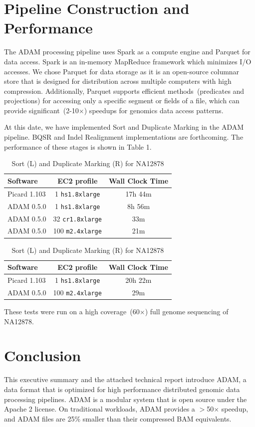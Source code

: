 \documentclass[10pt]{article}
\begin{document}
\section{Pipeline Construction and Performance}

The ADAM processing pipeline uses Spark as a compute engine and Parquet for data access. Spark is an in-memory MapReduce framework
which minimizes I/O accesses. We chose Parquet for data storage as it is an open-source columnar store that is designed for distribution across
multiple computers with high compression. Additionally, Parquet supports efficient methods~(predicates and projections) for accessing only a
specific segment or fields of a file, which can provide significant~(2-10$\times$) speedups for genomics data access patterns.

At this date, we have implemented Sort and Duplicate Marking in the ADAM pipeline. BQSR and Indel Realignment implementations are
forthcoming. The performance of these stages is shown in Table 1.

\begin{table}[h]
\small
\caption{Sort (L) and Duplicate Marking (R) for NA12878}
\begin{center}
\begin{tabular}{| l | c | c |}
\hline
\bf Software & \bf EC2 profile & \bf Wall Clock Time \\
\hline
\hline
Picard 1.103 & 1 \texttt{hs1.8xlarge} & 17h 44m \\
ADAM 0.5.0 & 1 \texttt{hs1.8xlarge} & 8h 56m \\
ADAM 0.5.0 & 32 \texttt{cr1.8xlarge} & 33m \\
ADAM 0.5.0 & 100 \texttt{m2.4xlarge} & 21m \\ 
\hline
\end{tabular}
\begin{tabular}{| l | c | c |}
\hline
\bf Software & \bf EC2 profile & \bf Wall Clock Time \\
\hline
\hline
Picard 1.103 & 1 \texttt{hs1.8xlarge} & 20h 22m \\
ADAM 0.5.0 & 100 \texttt{m2.4xlarge} & 29m \\
\hline
\end{tabular}
\end{center}
\end{table}

\noindent These tests were run on a high coverage~(60$\times$) full genome sequencing of NA12878.

\section{Conclusion}

This executive summary and the attached technical report introduce ADAM, a data format that is optimized for high performance
distributed genomic data processing pipelines. ADAM is a modular system that is open source under the Apache 2 license. On
traditional workloads, ADAM provides a $>$50$\times$ speedup, and ADAM files are 25\% smaller than their compressed BAM
equivalents.

\footnotesize




\end{document}
